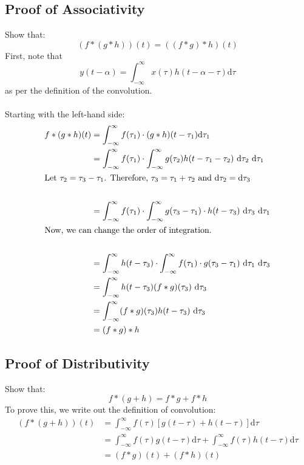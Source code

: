 \documentclass[10pt]{article}
\begin{document}
\subsection*{Proof of Associativity}
Show that:
\[(f * (g * h))(t) = ((f * g) * h)(t)\]
First, note that
\[y(t - \alpha) = \int_{-\infty}^\infty x(\tau) h(t - \alpha - \tau) \text{d}\tau\]
as per the definition of the convolution.\\\\
Starting with the left-hand side:
\begin{align*}
f * (g * h)(t) &= \int_{-\infty}^\infty f(\tau_1) \cdot (g * h)(t - \tau_1) \text{d}\tau_1\\
&= \int_{-\infty}^\infty f(\tau_1) \cdot \int_{-\infty}^\infty g(\tau_2) h(t - \tau_1 - \tau_2) \text{ d}\tau_2 \text{ d}\tau_1\\
\intertext{Let $\tau_2 = \tau_3 - \tau_1$.  Therefore, $\tau_3 = \tau_1 + \tau_2$ and $\text{d}\tau_2 = \text{d}\tau_3$}\\
&= \int_{-\infty}^\infty f(\tau_1) \cdot \int_{-\infty}^\infty g(\tau_3 - \tau_1) \cdot h(t - \tau_3) \text{ d} \tau_3 \text{ d}\tau_1\\
\intertext{Now, we can change the order of integration.}\\
&= \int_{-\infty}^\infty h(t - \tau_3) \cdot \int_{-\infty}^\infty f(\tau_1) \cdot g(\tau_3 - \tau_1) \text{ d} \tau_1 \text{ d} \tau_3\\
&= \int_{-\infty}^\infty h(t - \tau_3) (f * g) (\tau_3) \text{ d}\tau_3\\
&= \int_{-\infty}^\infty (f * g)(\tau_3) h(t - \tau_3) \text{ d}\tau_3\\
&= (f * g) * h
\end{align*}

\subsection*{Proof of Distributivity}
Show that:
\[f * (g + h) = f * g + f * h\]
To prove this, we write out the definition of convolution:
\begin{align*}
    (f * (g + h))(t) &= \int_{-\infty}^\infty f(\tau)[g(t - \tau) + h(t - \tau)] \text{d}\tau\\
    &= \int_{-\infty}^\infty f(\tau) g(t - \tau) \text{d}\tau + \int_{-\infty}^\infty f(\tau) h(t - \tau) \text{d}\tau\\
    &= (f * g)(t) + (f * h)(t)
\end{align*}
\end{document}
